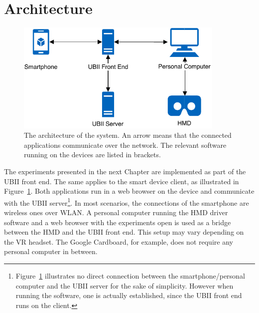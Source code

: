 \section{Architecture}\label{section:architecture}

\begin{figure}[H]
  \centering
  \includegraphics[width=10cm]{figures/implementation/architecture.pdf}
  \caption[The architecture of the system.]{The architecture of the system. An arrow means that the connected applications communicate over the network. The relevant software running on the devices are listed in brackets.}\label{fig:architecture}
\end{figure}

The experiments presented in the next Chapter are implemented as part of the \ac{UBII} front end. The same applies to the smart device client, as illustrated in Figure~\ref{fig:architecture}. Both applications run in a web browser on the device and communicate with the \ac{UBII} server\footnote{Figure~\ref{fig:architecture} illustrates no direct connection between the smartphone/personal computer and the \ac{UBII} server for the sake of simplicity. However when running the software, one is actually established, since the \ac{UBII} front end runs on the client.}. In most scenarios, the connections of the smartphone are wireless ones over \ac{WLAN}. A personal computer running the \ac{HMD} driver software and a web browser with the experiments open is used as a bridge between the \ac{HMD} and the \ac{UBII} front end. This setup may vary depending on the \ac{VR} headset. The Google Cardboard, for example, does not require any personal computer in between.
